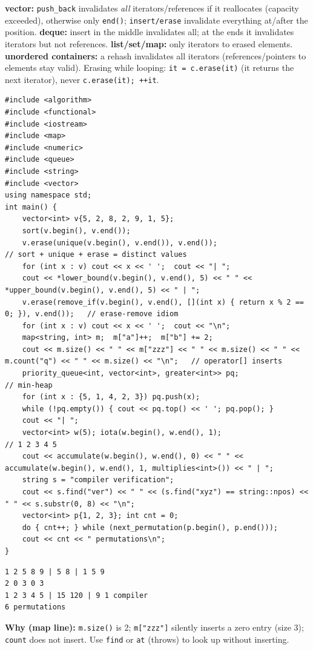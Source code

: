 \documentclass[10pt,a4paper,openany,oneside]{report}
\begin{document}
\begin{trapbox}
\textbf{vector:} \texttt{push\_back} invalidates \emph{all} iterators/references if it reallocates (capacity exceeded), otherwise only \texttt{end()}; \texttt{insert/erase} invalidate everything at/after the position. \textbf{deque:} insert in the middle invalidates all; at the ends it invalidates iterators but not references. \textbf{list/set/map:} only iterators to erased elements. \textbf{unordered containers:} a rehash invalidates all iterators (references/pointers to elements stay valid).
Erasing while looping: \texttt{it = c.erase(it)} (it returns the next iterator), never \texttt{c.erase(it); ++it}.
\end{trapbox}
\begin{lstlisting}[language={[11]C++},title={STL idioms: erase-remove, bounds, map[], heap, string search}]
#include <algorithm>
#include <functional>
#include <iostream>
#include <map>
#include <numeric>
#include <queue>
#include <string>
#include <vector>
using namespace std;
int main() {
    vector<int> v{5, 2, 8, 2, 9, 1, 5};
    sort(v.begin(), v.end());
    v.erase(unique(v.begin(), v.end()), v.end());                    // sort + unique + erase = distinct values
    for (int x : v) cout << x << ' ';  cout << "| ";
    cout << *lower_bound(v.begin(), v.end(), 5) << " " << *upper_bound(v.begin(), v.end(), 5) << " | ";
    v.erase(remove_if(v.begin(), v.end(), [](int x) { return x % 2 == 0; }), v.end());   // erase-remove idiom
    for (int x : v) cout << x << ' ';  cout << "\n";
    map<string, int> m;  m["a"]++;  m["b"] += 2;
    cout << m.size() << " " << m["zzz"] << " " << m.size() << " " << m.count("q") << " " << m.size() << "\n";   // operator[] inserts
    priority_queue<int, vector<int>, greater<int>> pq;                // min-heap
    for (int x : {5, 1, 4, 2, 3}) pq.push(x);
    while (!pq.empty()) { cout << pq.top() << ' '; pq.pop(); }
    cout << "| ";
    vector<int> w(5); iota(w.begin(), w.end(), 1);                    // 1 2 3 4 5
    cout << accumulate(w.begin(), w.end(), 0) << " " << accumulate(w.begin(), w.end(), 1, multiplies<int>()) << " | ";
    string s = "compiler verification";
    cout << s.find("ver") << " " << (s.find("xyz") == string::npos) << " " << s.substr(0, 8) << "\n";
    vector<int> p{1, 2, 3}; int cnt = 0;
    do { cnt++; } while (next_permutation(p.begin(), p.end()));
    cout << cnt << " permutations\n";
}
\end{lstlisting}
\begin{lstlisting}[style=out,title={Answer: captured output}]
1 2 5 8 9 | 5 8 | 1 5 9 
2 0 3 0 3
1 2 3 4 5 | 15 120 | 9 1 compiler
6 permutations
\end{lstlisting}
\textbf{Why (map line):} \texttt{m.size()} is 2; \texttt{m["zzz"]} silently inserts a zero entry (size 3); \texttt{count} does not insert. Use \texttt{find} or \texttt{at} (throws) to look up without inserting.
\end{document}
